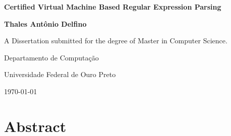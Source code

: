 \documentclass[oneside,12pt]{scrbook}
\theoremstyle{definition}
\theoremstyle{plain}
\theoremstyle{definition}
\begin{document}
\begin{titlepage}
\centering
\vspace*{1in}
\begin{Large}\bfseries
Certified Virtual Machine Based Regular Expression Parsing \par
\end{Large}
\vspace{1.5in}
\begin{large}\bfseries
Thales Antônio Delfino\par
\end{large}
\vfill
A Dissertation submitted for the degree of Master in Computer Science.
\par
\vspace{0.5in}
Departamento de Computação
\par
Universidade Federal de Ouro Preto
\par
\vspace{0.5in}
\today
\par
\end{titlepage}


\frontmatter
\tableofcontents


\chapter{Abstract}\label{chapter:abstract}

\end{document}

